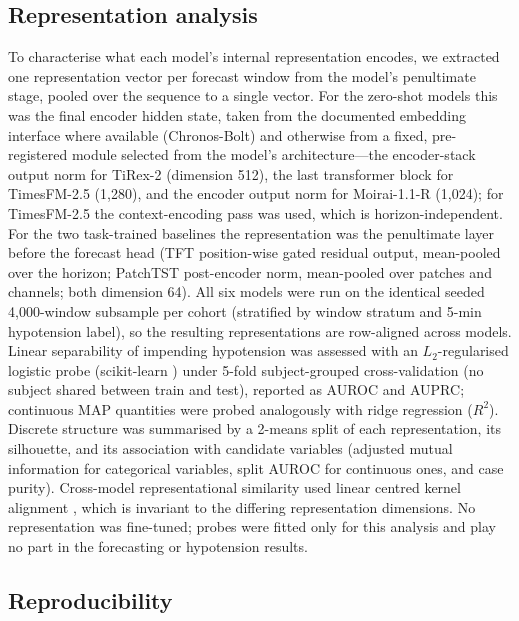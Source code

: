 \documentclass[11pt]{article}
\begin{document}
\subsection{Representation analysis}

To characterise what each model's internal representation encodes, we extracted
one representation vector per forecast window from the model's penultimate stage,
pooled over the sequence to a single vector. For the zero-shot models this was
the final encoder hidden state, taken from the documented embedding interface
where available (Chronos-Bolt) and otherwise from a fixed, pre-registered module
selected from the model's architecture---the encoder-stack output norm for
TiRex-2 (dimension 512), the last transformer block for TimesFM-2.5 (1{,}280),
and the encoder output norm for Moirai-1.1-R (1{,}024); for TimesFM-2.5 the
context-encoding pass was used, which is horizon-independent. For the two
task-trained baselines the representation was the penultimate layer before the
forecast head (TFT position-wise gated residual output, mean-pooled over the
horizon; PatchTST post-encoder norm, mean-pooled over patches and channels; both
dimension 64). All six models were run on the identical seeded 4{,}000-window
subsample per cohort (stratified by window stratum and 5-min hypotension label),
so the resulting representations are row-aligned across models. Linear
separability of impending hypotension was assessed with an $L_2$-regularised
logistic probe (scikit-learn \citep{Pedregosa2011}) under 5-fold subject-grouped cross-validation (no subject shared
between train and test), reported as AUROC and AUPRC; continuous MAP quantities
were probed analogously with ridge regression ($R^2$). Discrete structure was
summarised by a 2-means split of each representation, its silhouette, and its
association with candidate variables (adjusted mutual information for categorical
variables, split AUROC for continuous ones, and case purity). Cross-model
representational similarity used linear centred kernel alignment
\citep{Kornblith2019}, which is invariant to the differing representation
dimensions. No representation was fine-tuned; probes were fitted only for this
analysis and play no part in the forecasting or hypotension results.

\subsection{Reproducibility}
\end{document}
